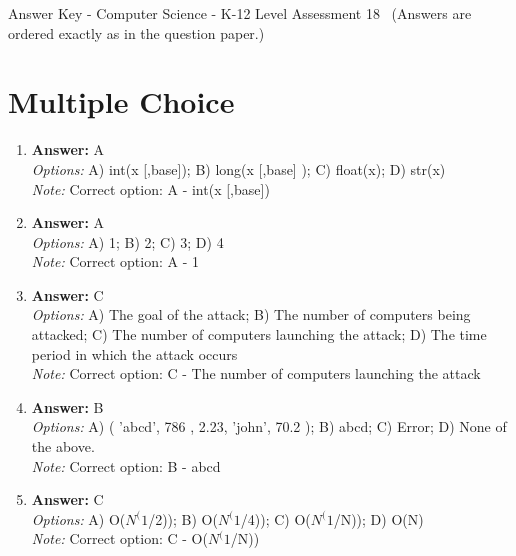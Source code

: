 \documentclass[12pt]{article}
\begin{document}
\begin{center}
Answer Key - Computer Science - K-12 Level Assessment 18 \
\small (Answers are ordered exactly as in the question paper.)
\end{center}

\section*{Multiple Choice}
\begin{enumerate}[label=\arabic*.]
\item \textbf{Answer:} A
\\ \textit{Options:} A) int(x [,base]); B) long(x [,base] ); C) float(x); D) str(x)
\\ \textit{Note:} Correct option: A - int(x [,base])
\item \textbf{Answer:} A
\\ \textit{Options:} A) 1; B) 2; C) 3; D) 4
\\ \textit{Note:} Correct option: A - 1
\item \textbf{Answer:} C
\\ \textit{Options:} A) The goal of the attack; B) The number of computers being attacked; C) The number of computers launching the attack; D) The time period in which the attack occurs
\\ \textit{Note:} Correct option: C - The number of computers launching the attack
\item \textbf{Answer:} B
\\ \textit{Options:} A) ( 'abcd', 786 , 2.23, 'john', 70.2 ); B) abcd; C) Error; D) None of the above.
\\ \textit{Note:} Correct option: B - abcd
\item \textbf{Answer:} C
\\ \textit{Options:} A) O($N^(1$/2)); B) O($N^(1$/4)); C) O($N^(1$/N)); D) O(N)
\\ \textit{Note:} Correct option: C - O($N^(1$/N))
\end{enumerate}
\end{document}
